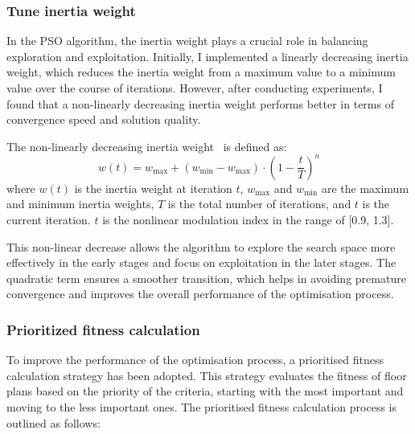 \documentclass[]{article}
\begin{document}
\subsubsection{Tune inertia weight}
In the PSO algorithm, the inertia weight plays a crucial role in balancing exploration and exploitation. Initially, I implemented a linearly decreasing inertia weight, which reduces the inertia weight from a maximum value to a minimum value over the course of iterations. However, after conducting experiments, I found that a non-linearly decreasing inertia weight performs better in terms of convergence speed and solution quality.

The non-linearly decreasing inertia weight~\cite{HousseinEssamH.2021MAiP} is defined as:
\begin{equation*}
    w(t) = w_{\text{max}} + (w_{\text{min}} - w_{\text{max}}) \cdot \left(1 - \frac{t}{T}\right)^n
\end{equation*}
where $w(t)$ is the inertia weight at iteration $t$, $w_{\text{max}}$ and $w_{\text{min}}$ are the maximum and minimum inertia weights, $T$ is the total number of iterations, and $t$ is the current iteration. $t$ is the nonlinear modulation index in the range of [0.9, 1.3].

This non-linear decrease allows the algorithm to explore the search space more effectively in the early stages and focus on exploitation in the later stages. The quadratic term ensures a smoother transition, which helps in avoiding premature convergence and improves the overall performance of the optimisation process.

\subsubsection{Prioritized fitness calculation}
To improve the performance of the optimisation process, a prioritised fitness calculation strategy has been adopted. This strategy evaluates the fitness of floor plans based on the priority of the criteria, starting with the most important and moving to the less important ones. The prioritised fitness calculation process is outlined as follows:
\end{document}
